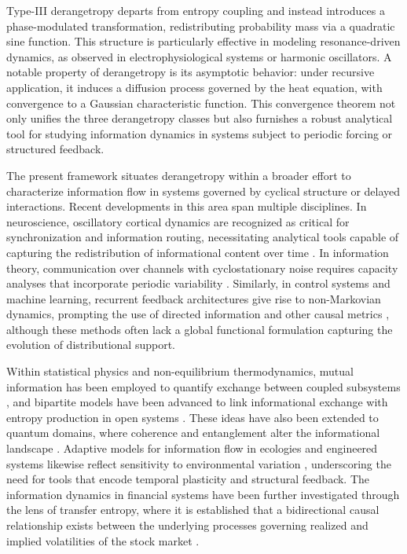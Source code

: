 \documentclass[sn-mathphys-num]{sn-jnl}%
\theoremstyle{thmstyleone}%
\theoremstyle{thmstyletwo}%
\theoremstyle{thmstylethree}%
\begin{document}
Type-III derangetropy departs from entropy coupling and instead introduces a phase-modulated transformation, redistributing probability mass via a quadratic sine function. This structure is particularly effective in modeling resonance-driven dynamics, as observed in electrophysiological systems or harmonic oscillators. A notable property of derangetropy is its asymptotic behavior: under recursive application, it induces a diffusion process governed by the heat equation, with convergence to a Gaussian characteristic function. This convergence theorem not only unifies the three derangetropy classes but also furnishes a robust analytical tool for studying information dynamics in systems subject to periodic forcing or structured feedback.

The present framework situates derangetropy within a broader effort to characterize information flow in systems governed by cyclical structure or delayed interactions. Recent developments in this area span multiple disciplines. In neuroscience, oscillatory cortical dynamics are recognized as critical for synchronization and information routing, necessitating analytical tools capable of capturing the redistribution of informational content over time \cite{buzsaki2004neuronal}. In information theory, communication over channels with cyclostationary noise requires capacity analyses that incorporate periodic variability \cite{shlezinger2019capacity, dabora2023capacity}. Similarly, in control systems and machine learning, recurrent feedback architectures give rise to non-Markovian dynamics, prompting the use of directed information and other causal metrics \cite{kramer1998directed, quinn2011estimating}, although these methods often lack a global functional formulation capturing the evolution of distributional support.

Within statistical physics and non-equilibrium thermodynamics, mutual information has been employed to quantify exchange between coupled subsystems \cite{vin2009mutual}, and bipartite models have been advanced to link informational exchange with entropy production in open systems \cite{horowitz2014thermodynamics}. These ideas have also been extended to quantum domains, where coherence and entanglement alter the informational landscape \cite{ptaszynski2019thermodynamics}. Adaptive models for information flow in ecologies and engineered systems likewise reflect sensitivity to environmental variation \cite{nicoletti2021mutual}, underscoring the need for tools that encode temporal plasticity and structural feedback. The information dynamics in financial systems have been further investigated through the lens of transfer entropy, where it is established that a bidirectional causal relationship exists between the underlying processes governing realized and implied volatilities of the stock market \cite{ataei2021theory}.
\end{document}
